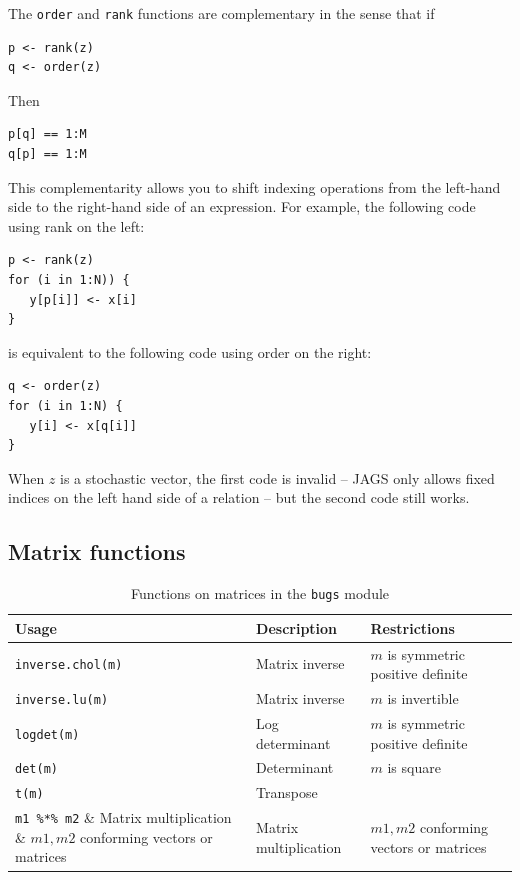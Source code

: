 \documentclass[11pt, a4paper, titlepage]{report}
\begin{document}
The \texttt{order} and \texttt{rank} functions are complementary
in the sense that if
\begin{verbatim}
p <- rank(z)
q <- order(z)
\end{verbatim}
Then
\begin{verbatim}
p[q] == 1:M
q[p] == 1:M
\end{verbatim}
This complementarity allows you to shift indexing operations from the
left-hand side to the right-hand side of an expression. For example,
the following code using rank on the left:
\begin{verbatim}
p <- rank(z)
for (i in 1:N)) {
   y[p[i]] <- x[i]
}
\end{verbatim}
is equivalent to the following code using order on the right:
\begin{verbatim}
q <- order(z)
for (i in 1:N) {
   y[i] <- x[q[i]]
}
\end{verbatim}
When $z$ is a stochastic vector, the first code is invalid -- JAGS
only allows fixed indices on the left hand side of a relation -- but
the second code still works.

\subsection{Matrix functions}

\begin{table}
\begin{center}
\begin{tabular}{lll}
\hline
Usage & Description & Restrictions \\
\hline
\verb+inverse.chol(m)+ & Matrix inverse & $m$ is symmetric positive definite  \\
\verb+inverse.lu(m)+ & Matrix inverse & $m$ is invertible \\
\verb+logdet(m)+ & Log determinant & $m$ is symmetric positive definite \\
\verb+det(m)+ & Determinant & $m$ is square \\
\verb+t(m)+    & Transpose                & \\
\verb+m1 %*% m2+  & Matrix multiplication & $m1,m2$ conforming vectors or matrices\\

\hline
\end{tabular}
\caption{Functions on matrices in the \texttt{bugs}
  module \label{table:bugs:matrix}}
\end{center}
\end{table}
\end{document}
